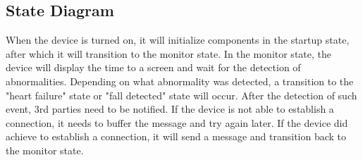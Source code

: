 \documentclass{article}
\begin{document}
\subsection{State Diagram}


\noindent
When the device is turned on, it will initialize components in the startup state, after which it will transition to the monitor state.
In the monitor state, the device will display the time to a screen and wait for the detection of abnormalities.
Depending on what abnormality was detected, a transition to the "heart failure" state or "fall detected" state will occur.
After the detection of such event, 3rd parties need to be notified.
If the device is not able to establish a connection, it needs to buffer the message and try again later.
If the device did achieve to establish a connection, it will send a message and transition back to the monitor state.

\clearpage



%

\end{document}

